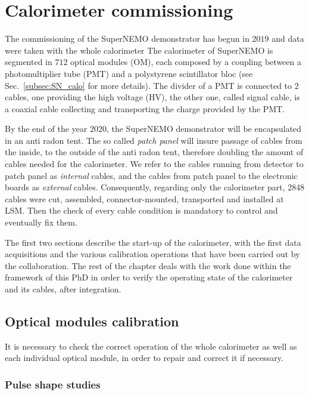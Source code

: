 \chapter{Calorimeter commissioning}
\label{ch:commissioning}

The commissioning of the SuperNEMO demonstrator has begun in $2019$ and data were taken with the whole calorimeter
The calorimeter of SuperNEMO is segmented in $712$ optical modules (OM), each composed by a coupling between a photomultiplier tube (PMT) and a polystyrene scintillator bloc (see Sec.~\ref{subsec:SN_calo} for more details).
The divider of a PMT is connected to $2$ cables, one providing the high voltage (HV), the other one, called signal cable, is a coaxial cable collecting and transporting the charge provided by the PMT.

By the end of the year $2020$, the SuperNEMO demonstrator will be encapsulated in an anti radon tent.
The so called \emph{patch panel} will insure passage of cables from the inside, to the outside of the anti radon tent, therefore doubling the amount of cables needed for the calorimeter.
We refer to the cables running from detector to patch panel as \emph{internal} cables, and the cables from patch panel to the electronic boards as \emph{external} cables.
Consequently, regarding only the calorimeter part, 2848 cables were cut, assembled, connector-mounted, transported and installed at LSM.
Then the check of every cable condition is mandatory to control and eventually fix them.

The first two sections describe the start-up of the calorimeter, with the first data acquisitions and the various calibration operations that have been carried out by the collaboration.
The rest of the chapter deals with the work done within the framework of this PhD in order to verify the operating state of the calorimeter and its cables, after integration.


\section{Optical modules calibration}

It is necessary to check the correct operation of the whole calorimeter as well as each individual optical module, in order to repair and correct it if necessary.

\subsection{Pulse shape studies}

